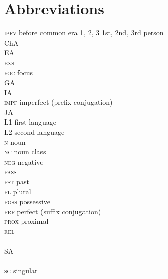 \documentclass[output=paper]{langsci/langscibook}
\begin{document}
\section*{Abbreviations}
\setlength{\columnsep}{30pt}
\begin{multicols}{2}
\begin{tabbing}
\textsc{ipfv} \hspace{1em} \= before common era\kill
\textsc{1, 2, 3} \> 1st, 2nd, 3rd person \\
ChA \>   \\
EA \>   \\
\textsc{exs} \>  \\
\textsc{foc} \> focus \\
GA \>   \\
IA \>   \\
\textsc{impf} \> imperfect (prefix conjugation) \\
JA \>   \\
L1 \> first language\\
L2 \> second language\\
\textsc{n} \> noun \\
\textsc{nc} \> noun class \\
\textsc{neg} \> negative \\
\textsc{pass} \>  \\
\textsc{pst} \> past \\
\textsc{pl} \> plural \\
\textsc{poss} \> possessive \\
\textsc{prf} \> perfect (suffix conjugation) \\
\textsc{prox} \> proximal \\
\textsc{rel} \>  \\
 \>  \\
SA \>   \\
 \>  \\
\textsc{sg} \> singular
\end{tabbing}
\end{multicols}


\sloppy\printbibliography[heading=subbibliography,notkeyword=this]
\end{document}
